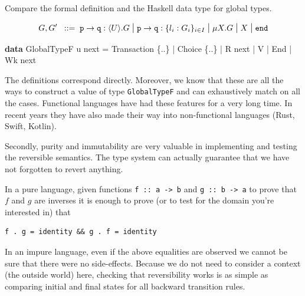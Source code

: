 \documentclass[runningheads,plain]{llncs}
\newenvironment{Shaded}{}{}
\newcommand{\KeywordTok}[1]{\textcolor[rgb]{0.00,0.44,0.13}{\textbf{#1}}}
\newcommand{\DataTypeTok}[1]{\textcolor[rgb]{0.56,0.13,0.00}{#1}}
\newcommand{\FunctionTok}[1]{\textcolor[rgb]{0.02,0.16,0.49}{#1}}
\newcommand{\NormalTok}[1]{#1}
\begin{document}
Compare the formal definition and the Haskell data type for global
types.

\begin{align*}
    G, G'  \bnfis & \gtcom{p}{q}{U}{G} %
    \sbnfbar
    \gtcho{p}{q}{\lbl_i}{G_i} %
    \sbnfbar %
    \mu X. G \sbnfbar X \sbnfbar \gend \\
\end{align*}

\begin{Shaded}
\begin{Highlighting}[]
\KeywordTok{data} \DataTypeTok{GlobalTypeF}\NormalTok{ u next }\FunctionTok{=} 
    \DataTypeTok{Transaction}\NormalTok{ \{}\FunctionTok{..}\NormalTok{\} }\FunctionTok{|} \DataTypeTok{Choice}\NormalTok{ \{}\FunctionTok{..}\NormalTok{\}  }\FunctionTok{|} \DataTypeTok{R}\NormalTok{ next }\FunctionTok{|} \DataTypeTok{V} \FunctionTok{|} \DataTypeTok{End} \FunctionTok{|} \DataTypeTok{Wk}\NormalTok{ next}
\end{Highlighting}
\end{Shaded}

The definitions correspond directly. Moreover, we know that these are
all the ways to construct a value of type \texttt{GlobalTypeF} and can
exhaustively match on all the cases. Functional languages have had these
features for a very long time. In recent years they have also made their
way into non-functional languages (Rust, Swift, Kotlin).

Secondly, purity and immutability are very valuable in implementing and
testing the reversible semantics. The type system can actually guarantee
that we have not forgotten to revert anything.

In a pure language, given functions
\texttt{f\ ::\ a\ -\textgreater{}\ b} and
\texttt{g\ ::\ b\ -\textgreater{}\ a} to prove that \(f\) and \(g\) are
inverses it is enough to prove (or to test for the domain you're
interested in) that

\begin{verbatim}
f . g = identity && g . f = identity
\end{verbatim}

In an impure language, even if the above equalities are observed we
cannot be sure that there were no side-effects. Because we do not need
to consider a context (the outside world) here, checking that
reversibility works is as simple as comparing initial and final states
for all backward transition rules.
\end{document}
